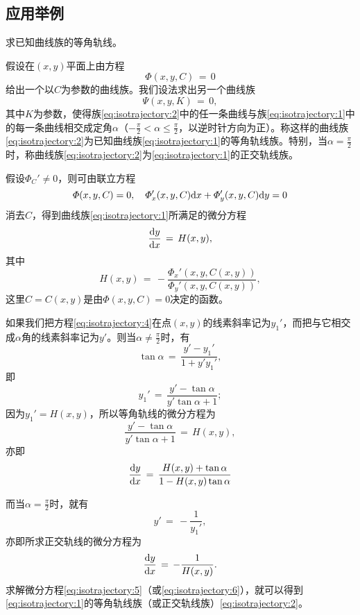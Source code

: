 \subsection{应用举例}
\begin{example}
求已知曲线族的等角轨线。\par
假设在$(x,y)$平面上由方程
\begin{equation}\label{eq:isotrajectory:1}
\varPhi(x,y,C)\,=\,0
\end{equation}
给出一个以$C$为参数的曲线族。我们设法求出另一个曲线族
\begin{equation}\label{eq:isotrajectory:2}
\varPsi(x,y,K)\,=\,0,
\end{equation}
其中$K$为参数，使得族\eqref{eq:isotrajectory:2}中的任一条曲线与族\eqref{eq:isotrajectory:1}中的每一条曲线相交成定角$\alpha$（$-\frac{\pi}{2}<\alpha\leq\frac{\pi}{2}$，以逆时针方向为正）。称这样的曲线族\eqref{eq:isotrajectory:2}为已知曲线族\eqref{eq:isotrajectory:1}的{\heiti 等角轨线族}。特别，当$\alpha=\frac{\pi}{2}$时，称曲线族\eqref{eq:isotrajectory:2}为\eqref{eq:isotrajectory:1}的正交轨线族。
\end{example}\par
假设$\varPhi_C'\neq 0$，则可由联立方程
\begin{equation}\label{eq:isotrajectory:3}
\varPhi(x,y,C)=0,\quad \varPhi_x'(x,y,C)\mathrm{d} x+\varPhi_y'(x,y,C)\mathrm{d} y=0
\end{equation}
消去$C$，得到曲线族\eqref{eq:isotrajectory:1}所满足的微分方程
\begin{equation}\label{eq:isotrajectory:4}
\frac{\mathrm{d}{}y}{\mathrm{d}{}x}\,=\,H(x,y),
\end{equation}
其中
$$H(x,y)\,=\,-\frac{\varPhi_x'(x,y,C(x,y))}{\varPhi_y'(x,y,C(x,y))},$$
这里$C=C(x,y)$是由$\varPhi(x,y,C)=0$决定的函数。\par
如果我们把方程\eqref{eq:isotrajectory:4}在点$(x,y)$的线素斜率记为$y_1'$，而把与它相交成$\alpha$角的线素斜率记为$y'$。则当$\alpha\neq\frac{\pi}{2}$时，有
$$\tan\alpha\,=\,\frac{y'-y_1'}{1+y'y_1'},$$
即
$$y_1'\,=\,\frac{y'-\tan\alpha}{y'\tan\alpha+1};$$
因为$y_1'=H(x,y)$，所以等角轨线的微分方程为
$$\frac{y'-\tan\alpha}{y'\tan\alpha+1}\,=\,H(x,y),$$
亦即
\begin{equation}\label{eq:isotrajectory:5}
\frac{\mathrm{d}{}y}{\mathrm{d}{}x}\,=\,\frac{H(x,y)+\tan\alpha}{1-H(x,y)\tan\alpha}
\end{equation}\par
而当$\alpha=\frac{\pi}{2}$时，就有
$$y'\,=\,-\frac{1}{y_1'},$$
亦即所求正交轨线的微分方程为
\begin{equation}\label{eq:isotrajectory:6}
\frac{\mathrm{d}{}y}{\mathrm{d}{}x}\,=\,-\frac{1}{H(x,y)}.
\end{equation}
求解微分方程\eqref{eq:isotrajectory:5}（或\eqref{eq:isotrajectory:6}），就可以得到\eqref{eq:isotrajectory:1}的等角轨线族（或正交轨线族）\eqref{eq:isotrajectory:2}。